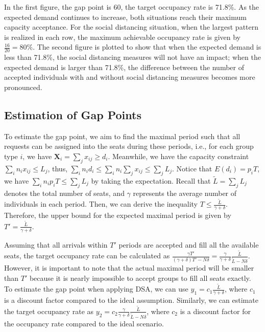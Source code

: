 In the first figure, the gap point is 60, the target occupancy rate is 71.8\%. As the expected demand continues to increase, both situations reach their maximum capacity acceptance. For the social distancing situation, when the largest pattern is realized in each row, the maximum achievable occupancy rate is given by $\frac{16}{20} = 80\%$. The second figure is plotted to show that when the expected demand is less than 71.8\%, the social distancing measures will not have an impact; when the expected demand is larger than 71.8\%, the difference between the number of accepted individuals with and without social distancing measures becomes more pronounced. 


\subsection{Estimation of Gap Points}
To estimate the gap point, we aim to find the maximal period such that all requests can be assigned into the seats during these periods, i.e., for each group type $i$, we have $\bm{X}_{i} = \sum_{j} x_{ij} \geq d_i$. Meanwhile, we have the capacity constraint $\sum_{i} n_{i} x_{ij} \leq L_j$, thus, $\sum_{i} n_i d_i \leq \sum_{i} n_i \sum_{j} x_{ij} \leq \sum_{j} L_{j}$. Notice that $E(d_i) = p_i T$, we have $\sum_{i} n_i p_i T \leq \sum_{j} L_{j}$ by taking the expectation. Recall that $\tilde{L} = \sum_{j} L_{j}$ denotes the total number of seats, and $\gamma$ represents the average number of individuals in each period. Then, we can derive the inequality $T \leq \frac{\tilde{L}}{\gamma + \delta}$. Therefore, the upper bound for the expected maximal period is given by $T' = \frac{\tilde{L}}{\gamma + \delta}$.


Assuming that all arrivals within $T'$ periods are accepted and fill all the available seats, the target occupancy rate can be calculated as $\frac{\gamma T'}{(\gamma+ \delta)T' - N \delta} = \frac{\gamma}{\gamma +\delta} \frac{\tilde{L}}{\tilde{L}-N \delta}$. However, it is important to note that the actual maximal period will be smaller than $T{'}$ because it is nearly impossible to accept groups to fill all seats exactly. To estimate the gap point when applying DSA, we can use $y_1 = c_1 \frac{\tilde{L}}{\gamma + \delta}$, where $c_1$ is a discount factor compared to the ideal assumption. Similarly, we can estimate the target occupancy rate as $y_2 = c_2 \frac{\gamma}{\gamma +\delta} \frac{\tilde{L}}{\tilde{L}-N \delta}$, where $c_2$ is a discount factor for the occupancy rate compared to the ideal scenario.

